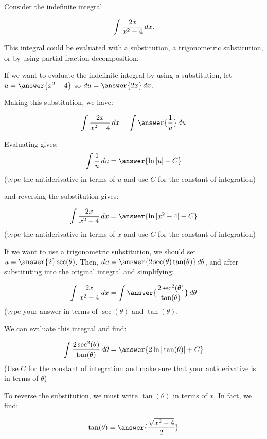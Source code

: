\documentclass{ximera}
\author{Jim Talamo}
\begin{document}
\begin{exercise}
Consider the indefinite integral 

\[
\int \frac{2x}{x^2-4} \mathop{}\!d x.
\]

This integral could be evaluated with a substitution, a trigonometric substitution, or by using partial fraction decomposition.

\begin{exercise}
If we want to evaluate the indefinite integral by using a substitution, let $u= \answer{x^2-4}$ so $\d u = \answer{2x} \d x$.

Making this substitution, we have:

\[
\int \frac{2x}{x^2-4} \d x = \int \answer{\frac{1}{u}} \d u
\]
\begin{exercise}
Evaluating gives:
\[
\int\frac{1}{u} \d u = \answer{\ln|u|+C}
\]
(type the antiderivative in terms of $u$ and use $C$ for the constant of integration)

and reversing the substitution gives:

\[
\int \frac{2x}{x^2-4} \d x = \answer{\ln|x^2-4|+C}
\]
(type the antiderivative in terms of $x$ and use $C$ for the constant of integration)
\end{exercise}
\end{exercise}
\begin{exercise}
If we want to use a trigonometric substitution, we should set $u=\answer{2} \sec(\theta)$.  Then, $\d u = \answer{2 \sec(\theta)\tan(\theta)} \d \theta$, and after substituting into the original integral and simplifying:

\[
\int \frac{2x}{x^2-4} \d x = \int \answer{\frac{2 \sec^2(\theta)}{\tan(\theta)}} \d \theta
\]
(type your answer in terms of $\sec(\theta)$ and $\tan(\theta)$.

\begin{exercise}
We can evaluate this integral and find:

\[
 \int \frac{2 \sec^2(\theta)}{\tan(\theta)} \d \theta = \answer{2 \ln|\tan(\theta)|+C}
\]
(Use $C$ for the constant of integration and make sure that your antiderivative is in terms of $\theta$)

\begin{exercise}

To reverse the substitution, we must write $\tan(\theta)$ in terms of $x$.  In fact, we find:

\[
\tan(\theta) = \answer{\frac{\sqrt{x^2-4}}{2}}
\]


\end{exercise}
\end{exercise}
\end{exercise}
\end{exercise}
\end{document}
